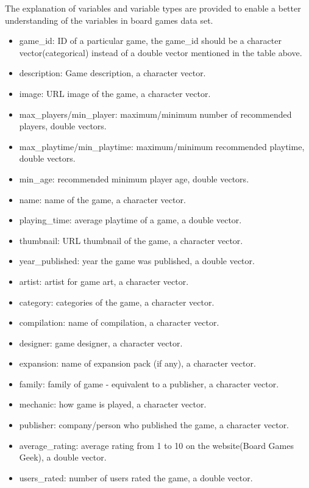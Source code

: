 \documentclass[
]{article}
\begin{document}
The explanation of variables and variable types are provided to enable a better understanding of the variables in board games data set.

\begin{itemize}
\item
  game\_id: ID of a particular game, the game\_id should be a character vector(categorical) instead of a double vector mentioned in the table above.
\item
  description: Game description, a character vector.
\item
  image: URL image of the game, a character vector.
\item
  max\_players/min\_player: maximum/minimum number of recommended players, double vectors.
\item
  max\_playtime/min\_playtime: maximum/minimum recommended playtime, double vectors.
\item
  min\_age: recommended minimum player age, double vectors.
\item
  name: name of the game, a character vector.
\item
  playing\_time: average playtime of a game, a double vector.
\item
  thumbnail: URL thumbnail of the game, a character vector.
\item
  year\_published: year the game was published, a double vector.
\item
  artist: artist for game art, a character vector.
\item
  category: categories of the game, a character vector.
\item
  compilation: name of compilation, a character vector.
\item
  designer: game designer, a character vector.
\item
  expansion: name of expansion pack (if any), a character vector.
\item
  family: family of game - equivalent to a publisher, a character vector.
\item
  mechanic: how game is played, a character vector.
\item
  publisher: company/person who published the game, a character vector.
\item
  average\_rating: average rating from 1 to 10 on the website(Board Games Geek), a double vector.
\item
  users\_rated: number of users rated the game, a double vector.
\end{itemize}
\end{document}
